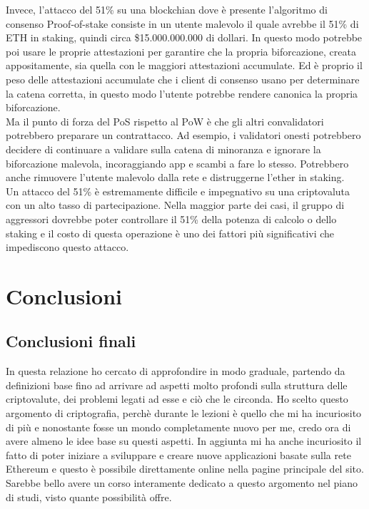 \documentclass[a4paper,11pt]{report}
\begin{document}
Invece, l'attacco del 51\% su una blockchian dove è presente l'algoritmo di consenso Proof-of-stake consiste in un utente malevolo il quale avrebbe il 51\% di ETH in staking, quindi circa \$15.000.000.000 di dollari. In questo modo potrebbe poi usare le proprie attestazioni per garantire che la propria biforcazione, creata appositamente, sia quella con le maggiori attestazioni accumulate. Ed è proprio il peso delle attestazioni accumulate che i client di consenso usano per determinare la catena corretta, in questo modo l'utente potrebbe rendere canonica la propria biforcazione.\\ 
Ma il punto di forza del PoS rispetto al PoW è che gli altri convalidatori potrebbero preparare un contrattacco. Ad esempio, i validatori onesti potrebbero decidere di continuare a validare sulla catena di minoranza e ignorare la biforcazione malevola, incoraggiando app e scambi a fare lo stesso. Potrebbero anche rimuovere l'utente malevolo dalla rete e distruggerne l'ether in staking. \\

Un attacco del 51\% è estremamente difficile e impegnativo su una criptovaluta con un alto tasso di partecipazione. Nella maggior parte dei casi, il gruppo di aggressori dovrebbe poter controllare il 51\% della potenza di calcolo o dello staking e il costo di questa operazione è uno dei fattori più significativi che impediscono questo attacco.

\chapter{Conclusioni}
\section{Conclusioni finali}
In questa relazione ho cercato di approfondire in modo graduale, partendo da definizioni base fino ad arrivare ad aspetti molto profondi sulla struttura delle criptovalute, dei problemi legati ad esse e ciò che le circonda. Ho scelto questo argomento di criptografia, perchè durante le lezioni è quello che mi ha incuriosito di più e nonostante fosse un mondo completamente nuovo per me, credo ora di avere almeno le idee base su questi aspetti. In aggiunta mi ha anche incuriosito il fatto di poter iniziare a sviluppare e creare nuove applicazioni basate sulla rete Ethereum e questo è possibile direttamente online nella pagine principale del sito. Sarebbe bello avere un corso interamente dedicato a questo argomento nel piano di studi, visto quante possibilità offre.   
\end{document}
